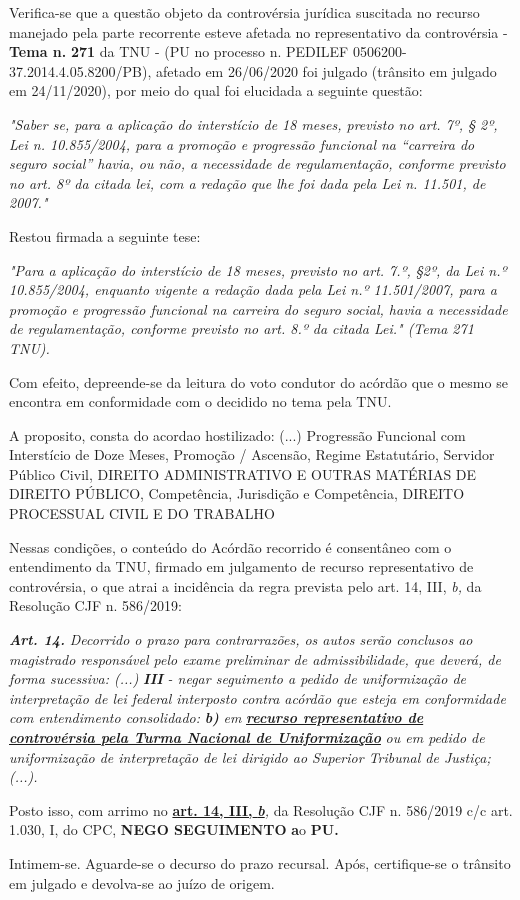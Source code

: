 \documentclass[12pt]{article}
\begin{document}
\justifying
\noindent Verifica-se que a questão objeto da controvérsia jurídica suscitada no recurso manejado pela parte recorrente esteve afetada no representativo da controvérsia - \textbf{Tema n. }\textbf{271} da TNU - (PU no processo n. PEDILEF 0506200-37.2014.4.05.8200/PB),  afetado em 26/06/2020 foi julgado (trânsito em julgado em 24/11/2020), por meio do qual foi elucidada a seguinte questão:

\noindent \textit{"Saber se, para a aplicação do interstício de 18 meses, previsto no art. 7º, § 2º, Lei n. 10.855/2004, para a promoção e progressão funcional na “carreira do seguro social” havia, ou não, a necessidade de regulamentação, conforme previsto no art. 8º da citada lei, com a redação que lhe foi dada pela Lei n. 11.501, de 2007."}

\noindent Restou firmada a seguinte tese:

\noindent \textit{"Para a aplicação do interstício de 18 meses, previsto no art. 7.º, §2º, da Lei n.º 10.855/2004, enquanto vigente a redação dada pela Lei n.º 11.501/2007, para a promoção e progressão funcional na carreira do seguro social, havia a necessidade de regulamentação, conforme previsto no art. 8.º da citada Lei." (Tema 271 TNU).}

\noindent Com efeito, depreende-se da leitura do voto condutor do acórdão que o mesmo se encontra em conformidade com o decidido no  tema pela TNU.

\noindent A proposito, consta do acordao hostilizado: (...) Progressão Funcional com Interstício de Doze Meses, Promoção / Ascensão, Regime Estatutário, Servidor Público Civil, DIREITO ADMINISTRATIVO E OUTRAS MATÉRIAS DE DIREITO PÚBLICO, Competência, Jurisdição e Competência, DIREITO PROCESSUAL CIVIL E DO TRABALHO

\noindent Nessas condições, o conteúdo do Acórdão recorrido é consentâneo com o entendimento da TNU, firmado em julgamento de recurso representativo de controvérsia, o que atrai a incidência da regra prevista pelo art. 14, III, \textit{b,} da Resolução CJF n. 586/2019:

\noindent \textit{\textbf{Art. 14.}}\textit{ Decorrido o prazo para contrarrazões, os autos serão conclusos ao magistrado responsável pelo exame preliminar de admissibilidade, que deverá, de forma sucessiva: (...) }\textit{\textbf{III }}\textit{- negar seguimento a pedido de uniformização de interpretação de lei federal interposto contra acórdão que esteja em conformidade com entendimento consolidado: }\textit{\textbf{b)}}\textit{ em }\uline{\textit{\textbf{recurso representativo de controvérsia pela Turma Nacional de Uniformização}}}\textit{ ou em pedido de uniformização de interpretação de lei dirigido ao Superior Tribunal de Justiça;(...).}

\noindent Posto isso, com arrimo no \uline{\textbf{art. 14, III, }}\uline{\textit{\textbf{b}}}\textit{,} da Resolução CJF n. 586/2019 c/c art. 1.030, I, do CPC, \textbf{NEGO SEGUIMENTO }\textbf{a}o\textbf{ PU}\textbf{.}

\noindent Intimem-se. Aguarde-se o decurso do prazo recursal. Após, certifique-se o trânsito em julgado e devolva-se ao juízo de origem.
\end{document}
